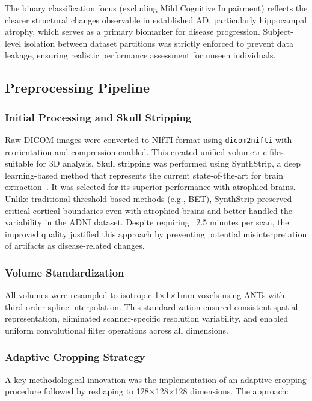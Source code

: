 \documentclass[12pt, a4paper]{article}
\begin{document}
The binary classification focus (excluding Mild Cognitive Impairment) reflects the clearer structural changes observable in established AD, particularly hippocampal atrophy, which serves as a primary biomarker for disease progression. Subject-level isolation between dataset partitions was strictly enforced to prevent data leakage, ensuring realistic performance assessment for unseen individuals.

\subsection{Preprocessing Pipeline}

\subsubsection{Initial Processing and Skull Stripping}

Raw DICOM images were converted to NIfTI format using \texttt{dicom2nifti} with reorientation and compression enabled. This created unified volumetric files suitable for 3D analysis. Skull stripping was performed using SynthStrip, a deep learning-based method that represents the current state-of-the-art for brain extraction~\cite{hoopes2022synthstrip}. It was selected for its superior performance with atrophied brains. Unlike traditional threshold-based methods (e.g., BET), SynthStrip preserved critical cortical boundaries even with atrophied brains and better handled the variability in the ADNI dataset. Despite requiring ~2.5 minutes per scan, the improved quality justified this approach by preventing potential misinterpretation of artifacts as disease-related changes.

\subsubsection{Volume Standardization}

All volumes were resampled to isotropic 1×1×1mm voxels using ANTs with third-order spline interpolation. This standardization ensured consistent spatial representation, eliminated scanner-specific resolution variability, and enabled uniform convolutional filter operations across all dimensions.

\subsubsection{Adaptive Cropping Strategy}

A key methodological innovation was the implementation of an adaptive cropping procedure followed by reshaping to 128×128×128 dimensions. The approach:
\end{document}
